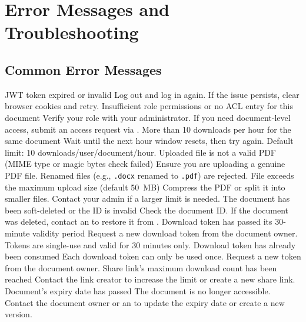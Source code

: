 \section{Error Messages and Troubleshooting}

\subsection{Common Error Messages}

\begin{ugErrorTable}
    {JWT token expired or invalid}
    {Log out and log in again. If the issue persists,
     clear browser cookies and retry.}
    {Insufficient role permissions or no ACL entry for
     this document}
    {Verify your role with your administrator. If you need
     document-level access, submit an access request
     via .}
    {More than 10 downloads per hour for the same document}
    {Wait until the next hour window resets, then try again.
     Default limit: 10 downloads/user/document/hour.}
    {Uploaded file is not a valid PDF (MIME type or magic
     bytes check failed)}
    {Ensure you are uploading a genuine PDF file. Renamed
     files (e.g., \texttt{.docx} renamed to \texttt{.pdf})
     are rejected.}
    {File exceeds the maximum upload size (default 50~MB)}
    {Compress the PDF or split it into smaller files.
     Contact your admin if a larger limit is needed.}
    {The document has been soft-deleted or the ID is invalid}
    {Check the document ID. If the document was deleted,
     contact an  to restore it from
     .}
    {Download token has passed its 30-minute validity period}
    {Request a new download token from the document owner.
     Tokens are single-use and valid for 30 minutes only.}
    {Download token has already been consumed}
    {Each download token can only be used once. Request a
     new token from the document owner.}
    {Share link's maximum download count has been reached}
    {Contact the link creator to increase the limit or
     create a new share link.}
    {Document's expiry date has passed}
    {The document is no longer accessible. Contact the
     document owner or an  to update the
     expiry date or create a new version.}
\end{ugErrorTable}


